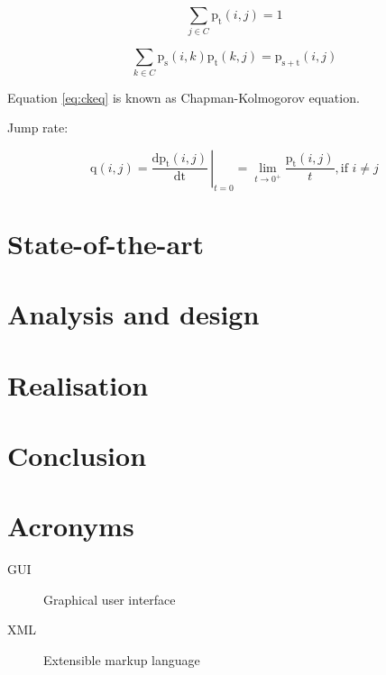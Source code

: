 \documentclass[thesis=M,english]{FITthesis}[2012/10/20]
\begin{document}
\begin{equation}
\sum_{j \in C} \mathrm{p_t}(i,j) = 1
\end{equation}

\begin{equation}\label{eq:ckeq}
\sum_{k \in C}\mathrm{p_s}(i,k)\mathrm{p_t}(k,j) = \mathrm{p_{s+t}}(i,j)     
\end{equation}

Equation \eqref{eq:ckeq} is known as Chapman-Kolmogorov equation. 




Jump rate:

\begin{equation}
\mathrm{q}(i,j) =  \left.\frac{\mathrm{d}\mathrm{p_t}(i,j)}{\mathrm{dt}} \,\right|_{t=0} = \lim_{t \to 0^+} \frac{\mathrm{p_t}(i,j)}{t}, \text{if } i\neq j     
\end{equation}

\section{}


\chapter{State-of-the-art}

\chapter{Analysis and design}

\chapter{Realisation}

\chapter{Conclusion}





\appendix

\chapter{Acronyms}
\begin{description}
	\item[GUI] Graphical user interface
	\item[XML] Extensible markup language
\end{description}
\end{document}
